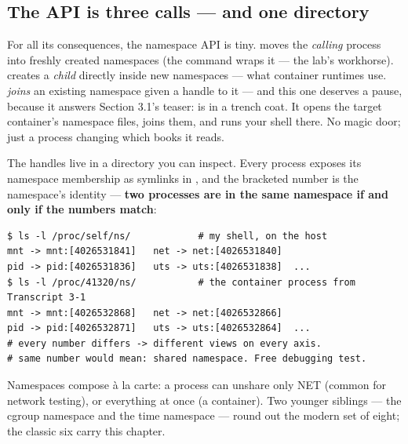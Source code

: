 \subsection*{The API is three calls — and one directory}

For all its consequences, the namespace API is tiny.  moves the \textit{calling} process into freshly created namespaces (the  command wraps it — the lab's workhorse).  creates a \textit{child} directly inside new namespaces — what container runtimes use.  \textit{joins} an existing namespace given a handle to it — and this one deserves a pause, because it answers Section 3.1's teaser:  is  in a trench coat. It opens the target container's namespace files, joins them, and runs your shell there. No magic door; just a process changing which books it reads.

The handles live in a directory you can inspect. Every process exposes its namespace membership as symlinks in , and the bracketed number is the namespace's identity — \textbf{two processes are in the same namespace if and only if the numbers match}:

\begin{terminalbox}
\begin{Verbatim}[breaklines=true,breakanywhere=true,fontsize=\small,formatcom=\color{tbbtermfg},codes=\tbbcodeactive]
$ ls -l /proc/self/ns/            # my shell, on the host
mnt -> mnt:[4026531841]   net -> net:[4026531840]
pid -> pid:[4026531836]   uts -> uts:[4026531838]  ...
$ ls -l /proc/41320/ns/           # the container process from Transcript 3-1
mnt -> mnt:[4026532868]   net -> net:[4026532866]
pid -> pid:[4026532871]   uts -> uts:[4026532864]  ...
# every number differs -> different views on every axis.
# same number would mean: shared namespace. Free debugging test.
\end{Verbatim}
\end{terminalbox}

Namespaces compose à la carte: a process can unshare only NET (common for network testing), or everything at once (a container). Two younger siblings — the cgroup namespace and the time namespace — round out the modern set of eight; the classic six carry this chapter.


